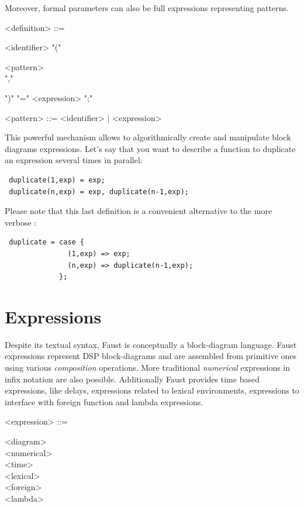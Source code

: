 \documentclass[a4paper]{book}
\begin{document}
Moreover, formal parameters can also be full expressions representing patterns. 

\begin{grammar}
  <definition> ::= 
  \begin{syntdiag}
    <identifier> "(" 
    \begin{rep}
      <pattern> \\ ","
    \end{rep}
    ")" "=" <expression> ";"
  \end{syntdiag}
\end{grammar}

\begin{grammar}
  <pattern> ::= 
    <identifier> |  <expression>
\end{grammar}

This powerful mechanism allows to algorithmically create and manipulate block diagrams expressions. Let's say that you want to describe a function to duplicate an expression several times in parallel:
\begin{lstlisting}
 duplicate(1,exp) = exp;
 duplicate(n,exp) = exp, duplicate(n-1,exp);
\end{lstlisting}

Please note that this last definition is a convenient alternative to the more verbose :
\begin{lstlisting}
 duplicate = case { 
               (1,exp) => exp; 
               (n,exp) => duplicate(n-1,exp); 
             };
\end{lstlisting}

 
  
\section{Expressions}

Despite its textual syntax, Faust is conceptually a block-diagram language. Faust expressions represent DSP block-diagrams and are assembled from primitive ones using various \textit{composition} operations. More traditional \textit{numerical} expressions in infix notation are also possible. Additionally Faust provides time based expressions, like delays, expressions related to lexical environments, expressions to interface with foreign function and lambda expressions.

\begin{grammar}
  <expression> ::= 
  \begin{syntdiag}
    \begin{stack}
      <diagram>\\
      <numerical>\\
      <time>\\
      <lexical>\\
      <foreign>\\
      <lambda>
    \end{stack}
  \end{syntdiag}
\end{grammar}
  
\end{document}
